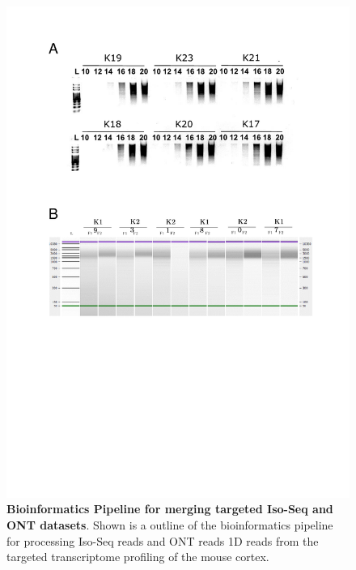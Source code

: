 \begin{figure}[htp]
	\centering
	\includegraphics[page=5,trim={0.5cm 7cm 0cm 0cm},clip,scale = 0.8]{Figures/TargetedTranscriptome_LabResults}
	\captionsetup{width=0.95\textwidth,singlelinecheck=off}
	\caption[Bioinformatics Pipeline for merging targeted Iso-Seq and ONT datasets]%
	{\textbf{Bioinformatics Pipeline for merging targeted Iso-Seq and ONT datasets}. Shown is a outline of the bioinformatics pipeline for processing Iso-Seq reads and ONT reads 1D reads from the targeted transcriptome profiling of the mouse cortex. 
	}
	\label{fig:Targeted_bioinformatics_pipeline}
\end{figure}

